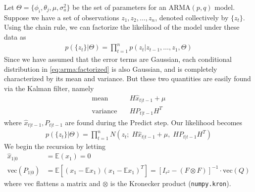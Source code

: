 Let $\Theta = \{\phi_i, \theta_j, \mu, \sigma_a^2\}$ be the set of parameters
for an $\text{ARMA}(p,q)$ model. 
Suppose we have a set of observations $z_1,z_2,\ldots,z_n$, denoted
collectively by $\{z_t\}$.
Using the chain rule, we can factorize the
likelihood of the model under these data as
\begin{align}
    \label{eq:arma:factorized}
    p(\{z_t\} | \Theta) = \prod_{t=1}^{n} p(z_t | z_{t-1}, \ldots, z_{1},
    \Theta)
\end{align}
Since we have assumed that the error terms are Gaussian, each conditional
distribution in \ref{eq:arma:factorized} is also Gaussian, and is completely
characterized by its mean and variance. But these two quantities are easily
found via the Kalman filter, namely
\begin{align}
    \text{mean} & \quad H\hat{x}_{t|t-1} + \mu \\
    \text{variance} & \quad HP_{t|t-1}H^T
\end{align}
where $\hat{x}_{t|t-1}, P_{t|t-1}$ are found during the Predict step. Our
likelihood becomes
\begin{align}
    \label{eq:arma:likelihood}
    p(\{z_t\} | \Theta) = \prod_{t=1}^{n} N(z_t;\; H\hat{x}_{t|t-1} + \mu,\;
    HP_{t|t-1}H^T)
\end{align}
We begin the recursion by letting
\begin{align}
    \hat{x}_{1|0} &= \mathbb{E}(x_1) = 0 \\
    \text{vec}(P_{1|0}) &= \mathbb{E}\left[(x_1 - \mathbb{E}x_1)(x_1 -
    \mathbb{E}x_1)^T\right] = \left[I_{r^2} - (F \otimes F)\right]^{-1} \cdot
    \text{vec}(Q)
\end{align}
where $\text{vec}$ flattens a matrix and $\otimes$ is the Kronecker product
({\tt numpy.kron}).

